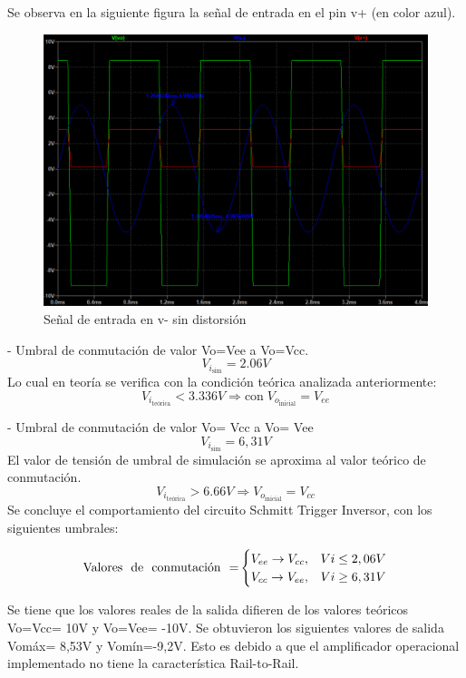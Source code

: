 Se observa en la siguiente figura la señal de entrada en el pin v+ (en color azul).

\begin{figure}[H]
    \centering
    \includegraphics[width=1.0\linewidth]{Secciones/Circuito4/Circuito 4 - Vi no atenuada.png}
    \caption{Señal de entrada en v- sin distorsión}
    \label{fig:ViNoAtenuada}
\end{figure}
- Umbral de conmutación de valor Vo=Vee a Vo=Vcc. 
\[V_{i_{\text{sim}}}= 2.06V\]
Lo cual en teoría se verifica con la condición teórica analizada anteriormente:
\[V_{i_{\text{teórica}}} < 3.336V \Rightarrow \text{con} \; V_{o_{\text{inicial}}} = V_{ee}\]

- Umbral de conmutación de valor Vo= Vcc a Vo= Vee 
\[V_{i_{\text{sim}}}= 6,31V\]
El valor de tensión de umbral de simulación se aproxima al valor teórico de conmutación.
\[V_{i_{\text{teórica}}} > 6.66V \Rightarrow V_{o_{\text{inicial}}}= V_{cc} \]
Se concluye el comportamiento del circuito Schmitt Trigger Inversor, con los siguientes umbrales:

\begin{equation}
    \text{Valores \space de \space conmutación \space =}
    \begin{cases}
      V_{ee} \rightarrow V_{cc}, &  Vi\leq2,06V \\
      V_{cc} \rightarrow V_{ee}, &  Vi\geq6,31V
    \end{cases}
  \end{equation}

Se tiene que los valores reales de la salida difieren de los valores teóricos Vo=Vcc= 10V y Vo=Vee= -10V. Se obtuvieron los siguientes valores de salida Vomáx= 8,53V y Vomín=-9,2V.  Esto es debido a que el amplificador operacional implementado no tiene la característica Rail-to-Rail. 


